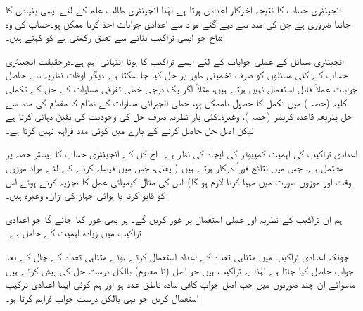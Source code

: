 انجینئری حساب کا نتیجہ آخرکار اعدادی ہوتا ہے لہٰذا انجینئری طالب علم  کے لئے ایسی بنیادی  کا جاننا ضروری ہے جن کی مدد سے دیے گئے مواد سے اعدادی جوابات اخذ کرنا ممکن ہو۔حساب کی وہ شاخ جو  ایسی تراکیب بنانے سے تعلق رکھتی ہے کو  کہتے ہیں۔ 

انجینئری مسائل کے عملی جوابات کے لئے ایسے تراکیب کا ہونا انتہائی اہم ہے۔درحقیقت انجینئری حساب کے کئی مسئلوں کو صرف تخمینی طور پر حل کیا جا سکتا ہے۔دیگر اوقات نظریہ سے حاصل جوابات عملاً قابل استعمال نہیں ہوتے ہیں، مثلاً اگر یک درجی خطی تفرقی مساوات کے حل کے تکملی کلیہ (حصہ ) میں تکمل کا حصول ناممکن ہو، خطی الجبرائی مساوات کے نظام کا مقطع کی مدد سے حل بذریعہ قاعدہ کریمر (حصہ )، وغیرہ۔کئی بار نظریہ صرف حل کی وجودیت کی یقین دہانی کرتا ہے لیکن اصل حل حاصل کرنے کے بارے میں کوئی مدد فراہم نہیں کرتا ہے۔

اعدادی تراکیب کی اہمیت کمپیوٹر کی ایجاد کی نظر ہے۔ آج کل کے انجینئری حساب کا بیشتر حصہ  پر مشتمل ہے، جس میں نتائج فوراً درکار ہوتے ہیں ( یعنی، جس میں فیصلہ کرنے کے لئے مواد موزوں وقت اور موزوں صورت میں مہیا کرنا  لازم ہو گا)۔اس کی مثال کیمیائی عمل کا تجزیہ کرتے ہوئے اس کو قابو کرنا یا ہوائی جہاز کی اڑان، وغیرہ ہیں۔  

ہم ان تراکیب کے نظریہ اور عملی استعمال پر غور کریں گے۔ پر بھی غور کیا جائے گا جو اعدادی تراکیب میں زیادہ اہمیت کے حامل ہے۔     

چونکہ اعدادی تراکیب میں متناہی تعداد کے اعداد استعمال کرتے ہوئے متناہی تعداد کے چال کے بعد جواب حاصل کیا جاتا ہے لہٰذا  یہ تراکیب   ہیں جو اصل (نا معلوم) بالکل درست حل کی  پیش کرتے ہیں ماسوائے ان چند صورتوں میں جب اصل جواب کافی سادہ ناطق عدد ہو اور ہم کوئی ایسا اعدادی ترکیب استعمال کریں جو یہی بالکل درست جواب فراہم کرتا ہو۔

